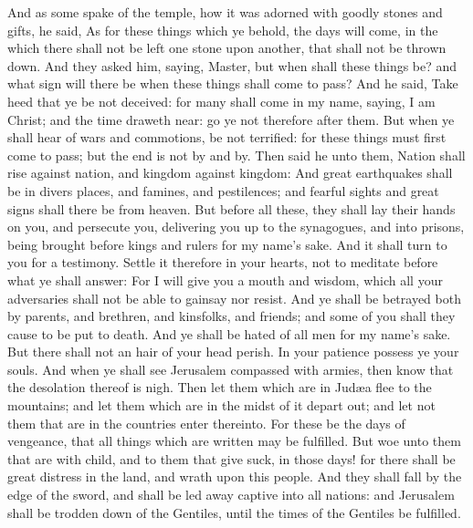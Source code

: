  And as some spake of the temple, how it was adorned with
goodly stones and gifts, he said,  As for these things
which ye behold, the days will come, in the which there shall not be
left one stone upon another, that shall not be thrown down.
 And they asked him, saying, Master, but when shall these
things be? and what sign will there be when these things shall come to
pass?  And he said, Take heed that ye be not deceived: for
many shall come in my name, saying, I am Christ; and the time draweth
near: go ye not therefore after them.  But when ye shall
hear of wars and commotions, be not terrified: for these things must
first come to pass; but the end is not by and by.  Then
said he unto them, Nation shall rise against nation, and kingdom against
kingdom:  And great earthquakes shall be in divers
places, and famines, and pestilences; and fearful sights and great signs
shall there be from heaven.  But before all these, they
shall lay their hands on you, and persecute you, delivering you up to
the synagogues, and into prisons, being brought before kings and rulers
for my name's sake.  And it shall turn to you for a
testimony.  Settle it therefore in your hearts, not to
meditate before what ye shall answer:  For I will give
you a mouth and wisdom, which all your adversaries shall not be able to
gainsay nor resist.  And ye shall be betrayed both by
parents, and brethren, and kinsfolks, and friends; and some of you shall
they cause to be put to death.  And ye shall be hated of
all men for my name's sake.  But there shall not an hair
of your head perish.  In your patience possess ye your
souls.  And when ye shall see Jerusalem compassed with
armies, then know that the desolation thereof is nigh. 
Then let them which are in Judæa flee to the mountains; and let them
which are in the midst of it depart out; and let not them that are in
the countries enter thereinto.  For these be the days of
vengeance, that all things which are written may be fulfilled.
 But woe unto them that are with child, and to them that
give suck, in those days! for there shall be great distress in the land,
and wrath upon this people.  And they shall fall by the
edge of the sword, and shall be led away captive into all nations: and
Jerusalem shall be trodden down of the Gentiles, until the times of the
Gentiles be fulfilled.

